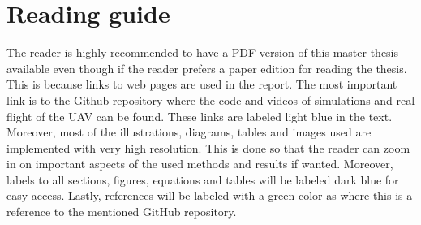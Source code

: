 \documentclass[../Head/report.tex]{subfiles}
\begin{document}
\thispagestyle{empty}
\section*{Reading guide}

The reader is highly recommended to have a PDF version of this master thesis available even though if the reader prefers a paper edition for reading the thesis. This is because links to web pages are used in the report. The most important link is to the \href{https://github.com/Kenil16/master\_project}{Github repository} where the code and videos of simulations and real flight of the UAV can be found. These links are labeled light blue in the text. Moreover, most of the illustrations, diagrams, tables and images used are implemented with very high resolution. This is done so that the reader can zoom in on important aspects of the used methods and results if wanted. Moreover, labels to all sections, figures, equations and tables will be labeled dark blue for easy access. Lastly, references will be labeled with a green color as \cite{masterThesis} where this is a reference to the mentioned GitHub repository. 
\end{document}
